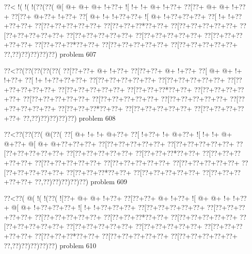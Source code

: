 \vbox{\vbox{\goo
\0??<\- !(\- !(\- !(\0??(\0??(
\- @[\- @+\- @+\- @+\- !+\0??+
\- ![\- !+\- !+\- @+\- !+\0??+
\0??[\0??+\- @+\- @+\- !+\0??+
\0??[\0??+\- @+\0??+\- !+\0??+
\0??[\- @+\- !+\- !+\0??+\0??+
\- ![\- @+\- !+\0??+\0??+\0??+
\0??[\- !+\- !+\0??+\0??+\0??+
\0??[\0??+\0??+\0??+\0??+\0??+
\0??[\0??+\0??+\0??*\0??+\0??+
\0??[\0??+\0??+\0??+\0??+\0??+
\0??[\0??+\0??+\0??+\0??+\0??+
\0??[\0??+\0??+\0??+\0??+\0??+
\0??[\0??+\0??+\0??+\0??+\0??+
\0??[\0??+\0??+\0??+\0??+\0??+
\0??[\0??+\0??+\0??*\0??+\0??+
\0??[\0??+\0??+\0??+\0??+\0??+
\0??[\0??+\0??+\0??+\0??+\0??+
\0??,\0??)\0??)\0??)\0??)\0??)
}
\hfil problem 607\hfil\break
}

\vbox{\vbox{\goo
\0??<\0??(\0??(\0??(\0??(\0??(
\0??[\0??+\0??+\- @+\- !+\0??+
\0??[\0??+\0??+\- @+\- !+\0??+
\0??[\- @+\- @+\- !+\- !+\0??+
\0??[\- !+\- !+\0??+\0??+\0??+
\0??[\0??+\0??+\0??+\0??+\0??+
\0??[\0??+\0??+\0??+\0??+\0??+
\0??[\0??+\0??+\0??+\0??+\0??+
\0??[\0??+\0??+\0??+\0??+\0??+
\0??[\0??+\0??+\0??*\0??+\0??+
\0??[\0??+\0??+\0??+\0??+\0??+
\0??[\0??+\0??+\0??+\0??+\0??+
\0??[\0??+\0??+\0??+\0??+\0??+
\0??[\0??+\0??+\0??+\0??+\0??+
\0??[\0??+\0??+\0??+\0??+\0??+
\0??[\0??+\0??+\0??*\0??+\0??+
\0??[\0??+\0??+\0??+\0??+\0??+
\0??[\0??+\0??+\0??+\0??+\0??+
\0??,\0??)\0??)\0??)\0??)\0??)
}
\hfil problem 608\hfil\break
}

\vbox{\vbox{\goo
\0??<\0??(\0??(\0??(\- @(\0??(
\0??[\- @+\- !+\- !+\- @+\0??+
\0??[\- !+\0??+\- !+\- @+\0??+
\- ![\- !+\- !+\- @+\- @+\0??+
\- @[\- @+\- @+\0??+\0??+\0??+
\0??[\0??+\0??+\0??+\0??+\0??+
\0??[\0??+\0??+\0??+\0??+\0??+
\0??[\0??+\0??+\0??+\0??+\0??+
\0??[\0??+\0??+\0??+\0??+\0??+
\0??[\0??+\0??+\0??*\0??+\0??+
\0??[\0??+\0??+\0??+\0??+\0??+
\0??[\0??+\0??+\0??+\0??+\0??+
\0??[\0??+\0??+\0??+\0??+\0??+
\0??[\0??+\0??+\0??+\0??+\0??+
\0??[\0??+\0??+\0??+\0??+\0??+
\0??[\0??+\0??+\0??*\0??+\0??+
\0??[\0??+\0??+\0??+\0??+\0??+
\0??[\0??+\0??+\0??+\0??+\0??+
\0??,\0??)\0??)\0??)\0??)\0??)
}
\hfil problem 609\hfil\break
}

\vbox{\vbox{\goo
\0??<\0??(\- @(\- !(\- !(\0??(
\- ![\0??+\- @+\- @+\- !+\0??+
\0??[\0??+\0??+\- @+\- !+\0??+
\- ![\- @+\- @+\- !+\- !+\0??+
\- @[\- @+\- !+\0??+\0??+\0??+
\- ![\- !+\- !+\0??+\0??+\0??+
\0??[\0??+\0??+\0??+\0??+\0??+
\0??[\0??+\0??+\0??+\0??+\0??+
\0??[\0??+\0??+\0??+\0??+\0??+
\0??[\0??+\0??+\0??*\0??+\0??+
\0??[\0??+\0??+\0??+\0??+\0??+
\0??[\0??+\0??+\0??+\0??+\0??+
\0??[\0??+\0??+\0??+\0??+\0??+
\0??[\0??+\0??+\0??+\0??+\0??+
\0??[\0??+\0??+\0??+\0??+\0??+
\0??[\0??+\0??+\0??*\0??+\0??+
\0??[\0??+\0??+\0??+\0??+\0??+
\0??[\0??+\0??+\0??+\0??+\0??+
\0??,\0??)\0??)\0??)\0??)\0??)
}
\hfil problem 610\hfil\break
}

